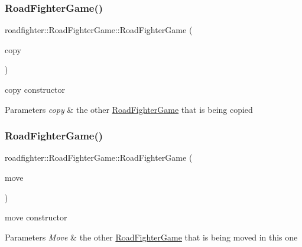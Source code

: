 \subsubsection{\texorpdfstring{Road\+Fighter\+Game()}{RoadFighterGame()}\hspace{0.1cm}{\footnotesize\ttfamily [3/4]}}
{\footnotesize\ttfamily roadfighter\+::\+Road\+Fighter\+Game\+::\+Road\+Fighter\+Game (\begin{DoxyParamCaption}\item[{const \hyperlink{classroadfighter_1_1RoadFighterGame}{Road\+Fighter\+Game} \&}]{copy }\end{DoxyParamCaption})\hspace{0.3cm}{\ttfamily [default]}}

copy constructor 
\begin{DoxyParams}{Parameters}
{\em copy} & the other \hyperlink{classroadfighter_1_1RoadFighterGame}{Road\+Fighter\+Game} that is being copied \\
\hline
\end{DoxyParams}
\mbox{\label{classroadfighter_1_1RoadFighterGame_ad5801b8550efd5b3c8b2029b5b11bd34}} 
\subsubsection{\texorpdfstring{Road\+Fighter\+Game()}{RoadFighterGame()}\hspace{0.1cm}{\footnotesize\ttfamily [4/4]}}
{\footnotesize\ttfamily roadfighter\+::\+Road\+Fighter\+Game\+::\+Road\+Fighter\+Game (\begin{DoxyParamCaption}\item[{\hyperlink{classroadfighter_1_1RoadFighterGame}{Road\+Fighter\+Game} \&\&}]{move }\end{DoxyParamCaption})\hspace{0.3cm}{\ttfamily [default]}}

move constructor 
\begin{DoxyParams}{Parameters}
{\em Move} & the other \hyperlink{classroadfighter_1_1RoadFighterGame}{Road\+Fighter\+Game} that is being moved in this one \\
\hline
\end{DoxyParams}
\mbox{\label{classroadfighter_1_1RoadFighterGame_ab7e8842d97c76acc3898eaab6ebacb69}} 
